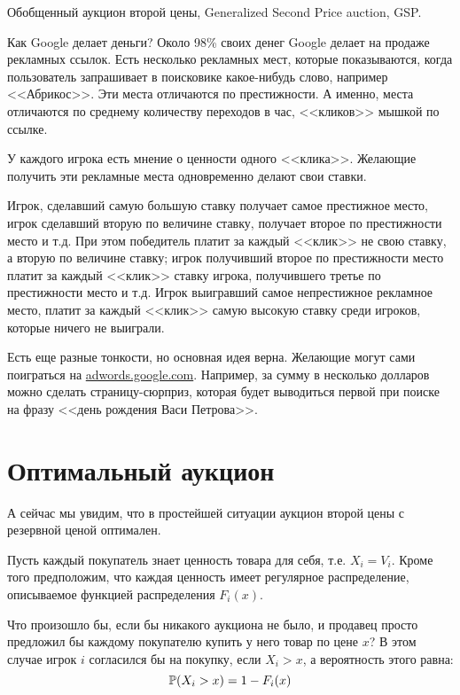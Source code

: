\begin{myex} Обобщенный аукцион второй цены, Generalized Second Price auction, GSP.

Как Google делает деньги? Около 98\% своих денег Google делает на продаже рекламных ссылок. Есть несколько рекламных мест, которые показываются, когда пользователь запрашивает в поисковике какое-нибудь слово, например <<Абрикос>>. Эти места отличаются по престижности. А именно, места отличаются по среднему количеству переходов в час, <<кликов>> мышкой по ссылке.

У каждого игрока есть мнение о ценности одного <<клика>>. Желающие получить эти рекламные места одновременно делают свои ставки. 

Игрок, сделавший самую большую ставку получает самое престижное место, игрок сделавший вторую по величине ставку, получает второе по престижности место и т.д.  При этом победитель платит за каждый <<клик>> не свою ставку, а вторую по величине ставку; игрок получивший второе по престижности место платит за каждый <<клик>> ставку игрока, получившего третье по престижности место и т.д. Игрок выигравший самое непрестижное рекламное место, платит за каждый <<клик>> самую высокую ставку среди игроков, которые ничего не выиграли.

Есть еще разные тонкости, но основная идея верна. Желающие могут сами поиграться на \url{adwords.google.com}. Например, за сумму в несколько долларов можно сделать страницу-сюрприз, которая будет выводиться первой при поиске на фразу <<день рождения Васи Петрова>>.
\end{myex}





\section{Оптимальный аукцион}

А сейчас мы увидим, что в простейшей ситуации аукцион второй цены с резервной ценой оптимален.

Пусть каждый покупатель знает ценность товара для себя, т.е.  $ X_{i}=V_{i} $. Кроме того предположим, что каждая ценность имеет регулярное распределение, описываемое функцией распределения $ F_{i}(x) $.

Что произошло бы, если бы никакого аукциона не было, и продавец просто предложил бы каждому покупателю купить у него товар по цене $ x $? В этом случае игрок $ i $ согласился бы на покупку, если $ X_{i}>x $, а вероятность этого равна:
\begin{equation}
\P(X_{i}>x)=1-F_{i}(x)
\end{equation}

